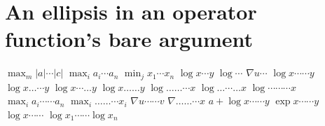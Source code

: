 \documentclass{article}
\begin{document}
\section{An ellipsis in an operator function's bare argument}
$\max_{m}|a|\cdots|c|$ $\max_i a_i\cdots a_n$ $\min_{j}x_1\cdots x_n$ $\log x\cdots y$ $\log\cdots$
$\nabla u\cdots$
$\log x\cdots\cdots y$ $\log x\ldots\cdots y$ $\log x\cdots\ldots y$ $\log x\ldots\ldots y$ $\log\ldots\ldots\cdots x$
$\log\ldots\cdots\ldots x$ $\log\cdots\cdots\cdots x$ $\max_i a_i\cdots\cdots a_n$ $\max_i\ldots\ldots\cdots x_i$ $\nabla u\cdots\cdots v$
$\nabla\ldots\ldots\cdots x$ $a+\log x\cdots\cdots y$ $\exp x\cdots\cdots y$ $\log x\cdots\cdots$ $\log x_1\cdots\cdots\log x_n$

\end{document}
